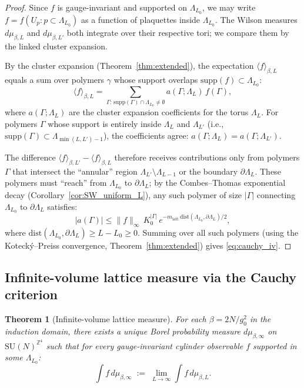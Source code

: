 \documentclass[11pt,a4paper]{amsart}
\newtheorem{theorem}{Theorem}[section]
\theoremstyle{definition}
\newcommand{\SU}{\mathrm{SU}}
\newcommand{\dist}{\mathrm{dist}}
\begin{document}
\begin{proof}
Since $f$ is gauge-invariant and supported on $\Lambda_{L_0}$, we may write
$f = f(U_p : p \subset \Lambda_{L_0})$ as a function of plaquettes inside $\Lambda_{L_0}$.
The Wilson measures $d\mu_{\beta,L}$ and $d\mu_{\beta,L'}$ both integrate over their
respective tori; we compare them by the linked cluster expansion.

By the cluster expansion (Theorem~\ref{thm:extended}), the expectation $\langle f\rangle_{\beta,L}$
equals a sum over polymers $\gamma$ whose support overlaps $\mathrm{supp}(f) \subset \Lambda_{L_0}$:
\[
  \langle f\rangle_{\beta,L}
  = \sum_{\Gamma:\,\mathrm{supp}(\Gamma)\cap\Lambda_{L_0}\ne\emptyset} a(\Gamma;\Lambda_L)\,f(\Gamma),
\]
where $a(\Gamma;\Lambda_L)$ are the cluster expansion coefficients for the torus $\Lambda_L$.
For polymers $\Gamma$ whose support is entirely inside $\Lambda_L$ and $\Lambda_{L'}$ (i.e.,
$\mathrm{supp}(\Gamma) \subset \Lambda_{\min(L,L')-1}$), the coefficients agree:
$a(\Gamma;\Lambda_L) = a(\Gamma;\Lambda_{L'})$.

The difference $\langle f\rangle_{\beta,L'} - \langle f\rangle_{\beta,L}$ therefore
receives contributions only from polymers $\Gamma$ that intersect the ``annular'' region
$\Lambda_{L'}\setminus\Lambda_{L-1}$ or the boundary $\partial\Lambda_L$.
These polymers must ``reach'' from $\Lambda_{L_0}$ to $\partial\Lambda_L$; by the
Combes--Thomas exponential decay (Corollary~\ref{cor:SW_uniform_L}), any such polymer
of size $|\Gamma|$ connecting $\Lambda_{L_0}$ to $\partial\Lambda_L$ satisfies:
\[
  |a(\Gamma)| \le \|f\|_\infty\, K_0^{|\Gamma|}\,e^{-m_{\mathrm{latt}}\,\dist(\Lambda_{L_0},\partial\Lambda_L)/2},
\]
where $\dist(\Lambda_{L_0}, \partial\Lambda_L) \ge L - L_0 \ge 0$.  Summing over all such
polymers (using the Koteck\'y--Preiss convergence, Theorem~\ref{thm:extended}) gives
\eqref{eq:cauchy_iv}.
\end{proof}

\subsection{Infinite-volume lattice measure via the Cauchy criterion}
\label{sec:infvol_kolmogorov}

\begin{theorem}[Infinite-volume lattice measure]
\label{thm:infvol_lattice}
For each $\beta = 2N/g_0^2$ in the induction domain, there exists a unique
Borel probability measure $d\mu_{\beta,\infty}$ on $\SU(N)^{\mathbb{Z}^4}$
such that for every gauge-invariant
cylinder observable $f$ supported in some $\Lambda_{L_0}$:
\[
  \int f\,d\mu_{\beta,\infty}
  \;:=\; \lim_{L\to\infty} \int f\,d\mu_{\beta,L}.
\]
\end{theorem}
\end{document}
